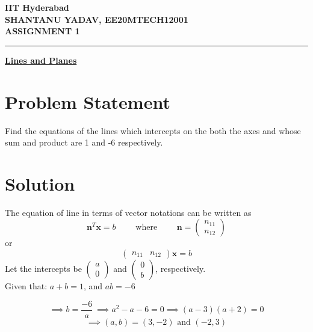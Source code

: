 \documentclass[12pt]{article}
\begin{document}
\begin{center}
	{\Large \bf IIT Hyderabad} \\ \vspace{2ex}
	{\large \bf SHANTANU YADAV, EE20MTECH12001 }\\
	\vspace{2ex}
	{\large \bf ASSIGNMENT 1} \\
\end{center}
	\hrule

\vspace{2ex}
\begin{center}
{\underline{\Large \bf Lines and Planes}}
\end{center}

\section*{Problem Statement}
Find the equations of the lines which intercepts on the both the axes and whose sum and product are 1 and -6 respectively.

\section*{Solution}
The equation of line in terms of vector notations can be written as
\begin{equation}
	{\mathbf{n}^T}{\mathbf x} = b 
	\qquad \text{ where } \qquad 
	\mathbf{n} = 
\begin{pmatrix}
	n_{11} \\ 
	n_{12}
\end{pmatrix}
\end{equation}
	or
\begin{equation}
\begin{pmatrix}
	n_{11} & n_{12}
\end{pmatrix}
	{\mathbf{x}} = b	\label{eq2}
\end{equation}
Let the intercepts be 
$\displaystyle
\begin{pmatrix}
	a \\ 0
\end{pmatrix}$
and 
$\displaystyle
\begin{pmatrix}
	0 \\ b
\end{pmatrix}$, respectively. \\

\noindent
Given that: \qquad \quad $ a + b = 1 $, \qquad and \qquad \quad $ ab = -6$ 

\begin{equation*}
\implies b = \frac{-6}{a} \  
\implies a^2 - a -6 =0
\implies (a-3)(a+2)=0
\end{equation*}
\begin{equation}
	\implies (a,b)=(3,-2) \text{ and } (-2,3)
\end{equation}
\end{document}
